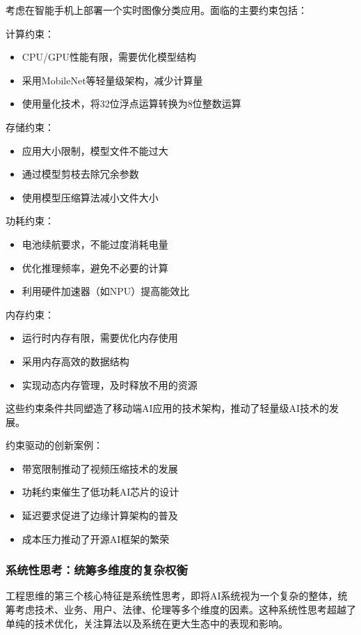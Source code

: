考虑在智能手机上部署一个实时图像分类应用。面临的主要约束包括：

计算约束：
\begin{itemize}
\item CPU/GPU性能有限，需要优化模型结构
\item 采用MobileNet等轻量级架构，减少计算量
\item 使用量化技术，将32位浮点运算转换为8位整数运算
\end{itemize}

存储约束：
\begin{itemize}
\item 应用大小限制，模型文件不能过大
\item 通过模型剪枝去除冗余参数
\item 使用模型压缩算法减小文件大小
\end{itemize}

功耗约束：
\begin{itemize}
\item 电池续航要求，不能过度消耗电量
\item 优化推理频率，避免不必要的计算
\item 利用硬件加速器（如NPU）提高能效比
\end{itemize}

内存约束：
\begin{itemize}
\item 运行时内存有限，需要优化内存使用
\item 采用内存高效的数据结构
\item 实现动态内存管理，及时释放不用的资源
\end{itemize}

这些约束条件共同塑造了移动端AI应用的技术架构，推动了轻量级AI技术的发展。

约束驱动的创新案例：

\begin{itemize}
\item 带宽限制推动了视频压缩技术的发展
\item 功耗约束催生了低功耗AI芯片的设计
\item 延迟要求促进了边缘计算架构的普及
\item 成本压力推动了开源AI框架的繁荣
\end{itemize}

\subsubsection{系统性思考：统筹多维度的复杂权衡}

工程思维的第三个核心特征是系统性思考，即将AI系统视为一个复杂的整体，统筹考虑技术、业务、用户、法律、伦理等多个维度的因素。这种系统性思考超越了单纯的技术优化，关注算法以及系统在更大生态中的表现和影响。

